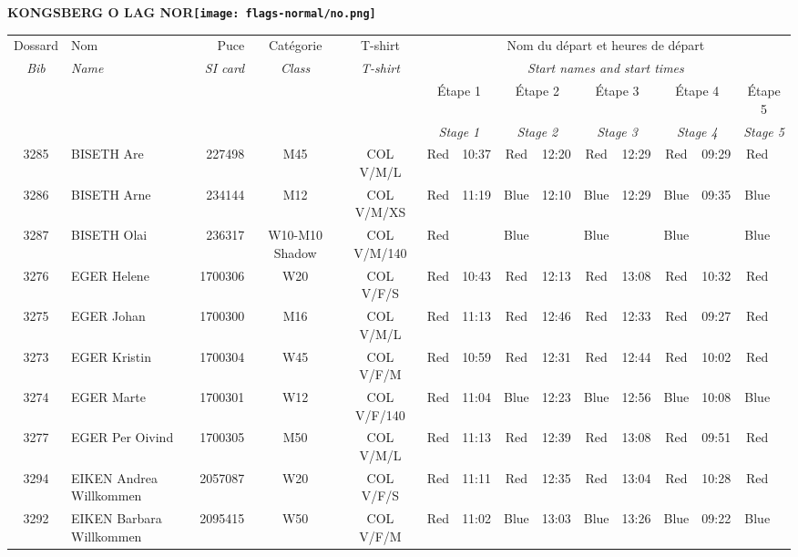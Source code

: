 \documentclass{report}
\begin{document}
\newpage
  \Huge \centering \bfseries KONGSBERG O LAG  NOR\normalfont \footnotesize \sffamily \hfill \texttt{[image: flags-normal/no.png]} \newline 
  \begin{longtable}{|c|l|r|c|c|*{5}{cc|}}
    Dossard & Nom  & Puce    & Catégorie & T-shirt & \multicolumn{10}{c|}{Nom du départ et heures de départ} \\
    \itshape Bib     & \itshape Name & \itshape SI card & \itshape Class  & \itshape  T-shirt  & \multicolumn{10}{c|}{\itshape Start names and start times} \\
    \hline
    & & & & & \multicolumn{2}{c|}{Étape 1} & \multicolumn{2}{c|}{Étape 2} & \multicolumn{2}{c|}{Étape 3} & \multicolumn{2}{c|}{Étape 4} & \multicolumn{2}{c|}{Étape 5} \\
    & & & & & \multicolumn{2}{c|}{\itshape Stage 1} & \multicolumn{2}{c|}{\itshape Stage 2} & \multicolumn{2}{c|}{\itshape Stage 3} & \multicolumn{2}{c|}{\itshape Stage 4} & \multicolumn{2}{c|}{\itshape Stage 5} \\
    \hline
    3285 & BISETH Are & 227498 & M45 & COL V/M/L & Red & 10:37 & Red & 12:20 & Red & 12:29 & Red & 09:29 & Red &  \\
    3286 & BISETH Arne & 234144 & M12 & COL V/M/XS & Red & 11:19 & Blue & 12:10 & Blue & 12:29 & Blue & 09:35 & Blue &  \\
    3287 & BISETH Olai & 236317 & W10-M10 Shadow & COL V/M/140 & Red &   & Blue &   & Blue &   & Blue &   & Blue &  \\
    3276 & EGER Helene & 1700306 & W20 & COL V/F/S & Red & 10:43 & Red & 12:13 & Red & 13:08 & Red & 10:32 & Red &  \\
    3275 & EGER Johan & 1700300 & M16 & COL V/M/L & Red & 11:13 & Red & 12:46 & Red & 12:33 & Red & 09:27 & Red &  \\
    3273 & EGER Kristin & 1700304 & W45 & COL V/F/M & Red & 10:59 & Red & 12:31 & Red & 12:44 & Red & 10:02 & Red &  \\
    3274 & EGER Marte & 1700301 & W12 & COL V/F/140 & Red & 11:04 & Blue & 12:23 & Blue & 12:56 & Blue & 10:08 & Blue &  \\
    3277 & EGER Per Oivind & 1700305 & M50 & COL V/M/L & Red & 11:13 & Red & 12:39 & Red & 13:08 & Red & 09:51 & Red &  \\
    3294 & EIKEN Andrea Willkommen & 2057087 & W20 & COL V/F/S & Red & 11:11 & Red & 12:35 & Red & 13:04 & Red & 10:28 & Red &  \\
    3292 & EIKEN Barbara Willkommen & 2095415 & W50 & COL V/F/M & Red & 11:02 & Blue & 13:03 & Blue & 13:26 & Blue & 09:22 & Blue &  \\

\end{longtable}
\end{document}
